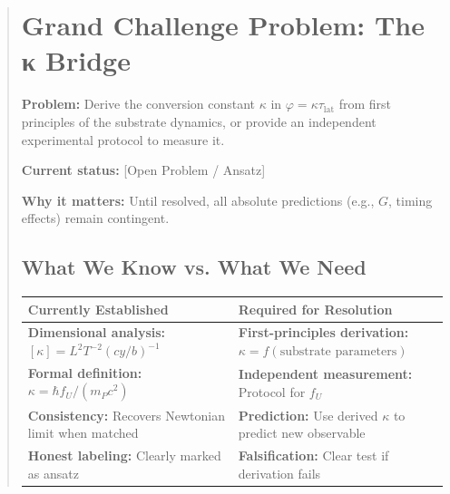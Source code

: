 \documentclass[11pt,titlepage]{article}
\begin{document}
\begin{abstract}

\section{Grand Challenge Problem: The κ Bridge}
\label{sec:kappa-grand-challenge}

\begin{tcolorbox}[colback=red!5!white,colframe=red!75!black,title=Grand Challenge Problem \#1: Deriving κ]
\label{gcp:kappa}
\textbf{Problem:} Derive the conversion constant $\kappa$ in $\varphi = \kappa \tau_{\mathrm{lat}}$ from first principles of the substrate dynamics, or provide an independent experimental protocol to measure it.

\textbf{Current status:} [Open Problem / Ansatz]

\textbf{Why it matters:} Until resolved, all absolute predictions (e.g., $G$, timing effects) remain contingent.
\end{tcolorbox}

\subsection{What We Know vs. What We Need}

\begin{tabular}{p{}p{}}
\textbf{Currently Established} & \textbf{Required for Resolution} \\ \hline
\textbf{Dimensional analysis:} $[\kappa] = L^2 T^{-2} (cy/b)^{-1}$ & \textbf{First-principles derivation:} $\kappa = f(\text{substrate parameters})$ \\
\textbf{Formal definition:} $\kappa = \hbar f_U / (m_P c^2)$ & \textbf{Independent measurement:} Protocol for $f_U$ \\
\textbf{Consistency:} Recovers Newtonian limit when matched & \textbf{Prediction:} Use derived $\kappa$ to predict new observable \\
\textbf{Honest labeling:} Clearly marked as ansatz & \textbf{Falsification:} Clear test if derivation fails \\
\end{tabular}


\end{abstract}
\end{document}
